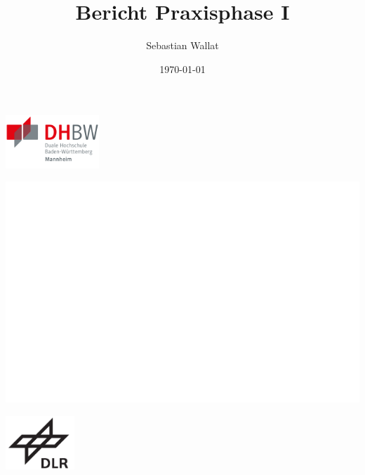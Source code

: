 \documentclass[12pt,a4paper,parskip=half]{scrreprt}
\title{Bericht Praxisphase I}
\author{Sebastian Wallat}
\date{\today}
\begin{document}
\begin{titlepage}
	
	\centering
	
		
		
	{%
		
		\begin{minipage}[c]{.25\textwidth}
			
			\includegraphics[width=\textwidth, height = 2cm]{dhbw-logo}
			
		\end{minipage}
		\begin{minipage}[c]{0.46\textwidth}
			
			\includegraphics[width=\textwidth]{empty}
			
		\end{minipage}
		\begin{minipage}[c]{.25\textwidth}
			
			\raggedleft
			
			\includegraphics[width=\textwidth, height =2cm, keepaspectratio]{dlr-logo}
			
		\end{minipage}
		
}
\end{titlepage}
\end{document}
